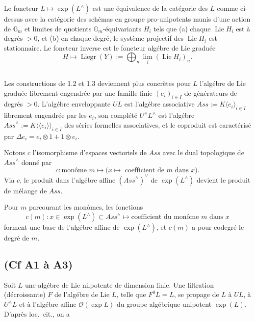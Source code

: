 \documentclass[11pt,a4paper]{article}
\theoremstyle{plain}
\theoremstyle{definition}
\DeclareMathOperator{\Lie}{Lie}
\DeclareMathOperator{\Liegr}{Liegr}
\newcommand{\Ass}{\textit{Ass}}
\newcommand{\Gm}{\mathbb{G}_m}
\begin{document}
Le foncteur $L \mapsto \exp(L^{\wedge})$ est une \'equivalence de la cat\'egorie des $L$ comme ci-dessus avec la cat\'egorie des sch\'emas en groupe pro-unipotents munis d'une action de $\Gm$ et limites de quotients $\Gm$-\'equivariants $H_i$ tels que (a) chaque $\Lie H_i$ est \`a degr\'es $> 0$, et (b) en chaque degr\'e, le syst\`eme projectif des $\Lie H_i$ est stationnaire. Le foncteur inverse est le foncteur alg\'ebre de Lie gradu\'ee
\[
H \mapsto \Liegr(Y) := \bigoplus_n \lim_i (\Lie H_i)_n.
\]

\subsection{}
Les constructions de 1.2 et 1.3 deviennent plus concr\`etes pour $L$ l'alg\'ebre de Lie gradu\'ee librement engendr\'ee par une famille finie $(e_i)_{i \in I}$ de g\'en\'erateurs de degr\'es $> 0$. L'alg\'ebre enveloppante $UL$ est l'alg\'ebre associative $\Ass := K\langle e_i \rangle_{i \in I}$ librement engendr\'ee par les $e_i$, son compl\'et\'e $U^{\wedge}L^{\wedge}$ est l'alg\'ebre $\Ass^{\wedge} := K\langle\langle e_i \rangle\rangle_{i \in I}$ des s\'eries formelles associatives, et le coproduit est caract\'eris\'e par $\Delta e_i = e_i \otimes 1 + 1 \otimes e_i$.

Notons $c$ l'isomorphisme d'espaces vectoriels de $\Ass$ avec le dual topologique de $\Ass^{\wedge}$ donn\'e par
\begin{equation}
\label{eq:1.4.1}
c: \text{mon\^ome } m \mapsto \text{($x \mapsto$ coefficient de $m$ dans $x$)}.
\end{equation}
Via $c$, le produit dans l'alg\'ebre affine $(\Ass^{\wedge})^{\vee}$ de $\exp(L^{\wedge})$ devient le produit de m\'elange de $\Ass$.

Pour $m$ parcourant les mon\^omes, les fonctions
\begin{equation}
\label{eq:1.4.2}
c(m): x \in \exp(L^{\wedge}) \subset \Ass^{\wedge} \mapsto \text{coefficient du mon\^ome $m$ dans $x$}
\end{equation}
forment une base de l'alg\'ebre affine de $\exp(L^{\wedge})$, et $c(m)$ a pour codegr\'e le degr\'e de $m$.

\subsection{(Cf \cite{1} A1 \`a A3)}
Soit $L$ une alg\'ebre de Lie nilpotente de dimension finie. Une filtration (d\'ecroissante) $F$ de l'alg\'ebre de Lie $L$, telle que $F^0L = L$, se propage de $L$ \`a $UL$, \`a $U^{\wedge}L$ et \`a l'alg\'ebre affine $\mathcal{O}(\exp L)$ du groupe alg\'ebrique unipotent $\exp(L)$. D'apr\`es loc.~cit., on a
\end{document}
